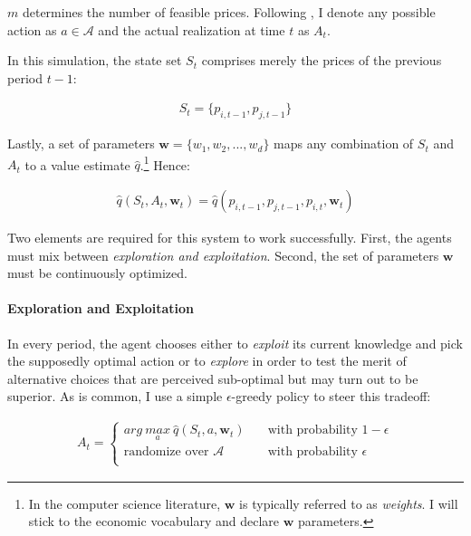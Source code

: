 $m$ determines the number of feasible prices. Following \textcite{sutton_reinforcement_2018}, I denote any possible action as $a \in \mathcal{A}$ and the actual realization at time $t$ as $A_t$.

In this simulation, the state set $S_t$  comprises merely the prices of the previous period $t-1$:

\begin{gather}
S_t = \{ p_{i, t-1}, p_{j, t-1} \}
\end{gather}



Lastly, a set of parameters $\boldsymbol{w} = \{w_1, w_2, ..., w_d\}$ maps any combination of $S_t$ and $A_t$ to a value estimate $\hat{q}$.\footnote{In the computer science literature, $\boldsymbol{w}$ is typically referred to as \emph{weights}. I will stick to the economic vocabulary and declare $\boldsymbol{w}$ parameters.} Hence:

\begin{gather}\label{q_estimation}
	\hat{q}(S_t,A_t,\boldsymbol{w}_t) = \hat{q}(p_{i, t-1}, p_{j, t-1}, p_{i, t}, \boldsymbol{w}_t)
\end{gather}

Two elements are required for this system to work successfully. First, the agents must mix between \emph{exploration and exploitation}. Second, the set of parameters $\boldsymbol{w}$ must be continuously optimized.

\paragraph{Exploration and Exploitation} 
In every period, the agent chooses either to \emph{exploit} its current knowledge and pick the supposedly optimal action or to \emph{explore} in order to test the merit of alternative choices that are perceived sub-optimal but may turn out to be superior. As is common, I use a simple $\epsilon$-greedy policy to steer this tradeoff:

\begin{gather}\label{action_selection}
 A_t = \begin{cases} arg ~\underset{a}{max} ~ \hat{q}(S_t,a,\boldsymbol{w}_t) & \quad \text{with probability } 1 - \epsilon\\
\text{randomize over } \mathcal{A} & \quad \text{with probability } \epsilon\\ \end{cases} 
\end{gather}

